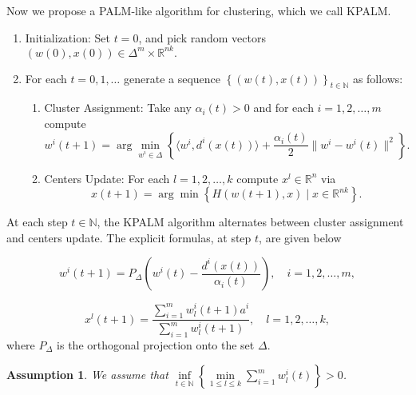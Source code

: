 \documentclass[11pt]{article}
\numberwithin{equation}{section}
\newtheorem{assumption}{Assumption}
\begin{document}
Now we propose a PALM-like algorithm for clustering, which we call KPALM.
\begin{enumerate}[(1)]
	\item Initialization: Set $t=0$, and pick random vectors $(w(0),x(0)) \in \Delta^m \times \mathbb{R}^{nk} .$

	\item For each $t=0,1, \ldots$ generate a sequence $\left\lbrace(w(t),x(t))\right\rbrace_{t \in \mathbb{N}}$ as follows:
	\begin{enumerate}[(2.1)]
		\item Cluster Assignment: Take any $\alpha_i(t) > 0$ and for each $i=1, 2, \ldots ,m$ compute
		\begin{equation}
			w^i(t+1) = \arg\min\limits_{w^i \in \Delta} \left\lbrace \langle w^i , d^i(x(t)) \rangle + \frac{\alpha_i(t)}{2} \|w^i - w^i(t)\|^2 \right\rbrace . \label{StateEq5}
		\end{equation}
		
		\item Centers Update: For each $l=1, 2, \ldots ,k$ compute $x^l \in \mathbb{R}^n$ via
		\begin{equation}
			x(t+1) = \arg\min \left\lbrace H(w(t+1), x) \mid x \in \mathbb{R}^{nk} \right\rbrace . \label{StateEq6}
		\end{equation}
	\end{enumerate}
\end{enumerate}

\newpage

At each step $t \in \mathbb{N}$, the KPALM algorithm alternates between cluster assignment and centers update. The explicit formulas, at step $t$, are given below

\begin{equation}
w^i(t+1) = P_{\Delta} \left(w^i(t) - \frac{d^i(x(t))}{\alpha_i(t)}\right) , \quad i=1, 2, \ldots ,m , \label{StateEq7}
\end{equation}

\begin{equation}
x^l(t+1) = \frac{\sum_{i=1}^{m} w^i_l(t+1) a^i}{\sum_{i=1}^{m} w^i_l(t+1)} , \quad l=1, 2, \ldots ,k , \label{StateEq8}
\end{equation}
where $P_{\Delta}$ is the orthogonal projection onto the set $\Delta$.

\begin{assumption} \label{StateEq17}
We assume that $\inf\limits_{t \in \mathbb{N}} \left\lbrace \min\limits_{1 \leq l \leq k} \sum\limits_{i=1}^{m} w^i_l(t) \right\rbrace > 0$.
\end{assumption}
	
\end{document}
